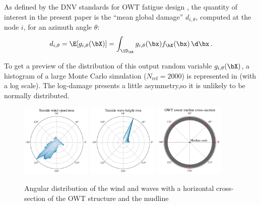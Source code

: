As defined by the DNV standards for OWT fatigue design \citep{dnv_fatigue_2016}, the quantity of interest in the present paper is the ``mean global damage'' $d_{i, \theta}$, computed at the node $i$, for an azimuth angle $\theta$:
\begin{equation}
    d_{i, \theta} = \E[g_{i, \theta}(\bX)] = \int_{\iD_\bX} g_{i, \theta}(\bx) f_{\bX}(\bx)\, \d \bx \,.
    \label{eq:mean_integral}
\end{equation}

To get a preview of the distribution of this output random variable $g_{i, \theta}(\bX)$, a histogram of a large Monte Carlo simulation ($N_{\mathrm{ref}}=2000$) is represented in  (with a log scale). 
The log-damage presents a little asymmetry,so it is unlikely to be normally distributed.

\begin{figure}[!h]
\begin{center}
    \includegraphics[width=0.3\textwidth]{part2/figures/DCE/teesside/teeside_wind_rose.pdf} \quad
    \includegraphics[width=0.3\textwidth]{part2/figures/DCE/teesside/teeside_wave_rose.pdf} \quad
    \includegraphics[width=0.3\textwidth]{part2/figures/DCE/teesside/mudline_crossection.pdf}
\end{center}
\caption{Angular distribution of the wind and waves with a horizontal cross-section of the OWT structure and the mudline\label{fig:wind_wave_roses}}
\end{figure}

